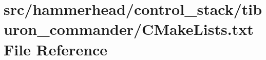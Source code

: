 \hypertarget{control__stack_2tiburon__commander_2CMakeLists_8txt}{}\section{src/hammerhead/control\+\_\+stack/tiburon\+\_\+commander/\+C\+Make\+Lists.txt File Reference}
\label{control__stack_2tiburon__commander_2CMakeLists_8txt}
